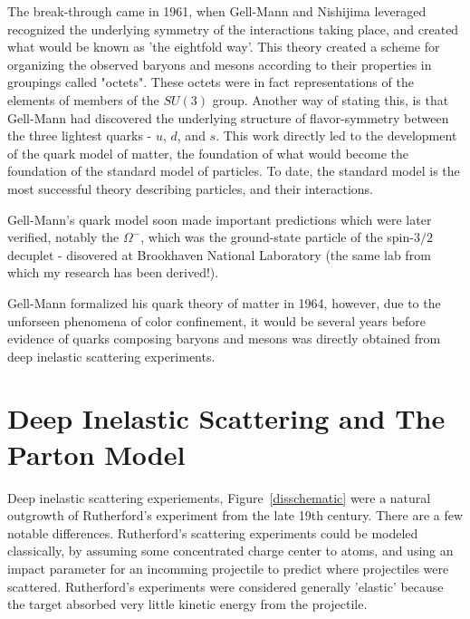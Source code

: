 The break-through came in 1961, when Gell-Mann and Nishijima leveraged
recognized the underlying symmetry of the interactions taking place, and created
what would be known as 'the eightfold way'. This theory created a scheme for
organizing the observed baryons and mesons according to their properties in
groupings called "octets". These octets were in fact representations of the
elements of members of the $SU(3)$ group. Another way of stating this, is that
Gell-Mann had discovered the underlying structure of flavor-symmetry between the
three lightest quarks - $u$, $d$, and $s$. This work directly led to the
development of the quark model of matter, the foundation of what would become
the foundation of the standard model of particles. To date, the standard model
is the most successful theory describing particles, and their interactions.

Gell-Mann's quark model soon made important predictions which were later
verified, notably the $\Omega^{-}$, which was the ground-state particle of the
spin-$3/2$ decuplet - disovered at Brookhaven National Laboratory (the same lab
from which my research has been derived!). 

Gell-Mann formalized his quark theory of matter in 1964, however, due to the
unforseen phenomena of color confinement, it would be several years before
evidence of quarks composing baryons and mesons was directly obtained from deep
inelastic scattering experiments.

\clearpage

\section{Deep Inelastic Scattering and The Parton Model}

Deep inelastic scattering experiements, Figure~\ref{disschematic} were a natural
outgrowth of Rutherford's experiment from the late 19th century. There are a few
notable differences.  Rutherford's scattering experiments could be modeled
classically, by assuming some concentrated charge center to atoms, and using an
impact parameter for an incomming projectile to predict where projectiles were
scattered. Rutherford's experiments were considered generally 'elastic' because
the target absorbed very little kinetic energy from the projectile.

